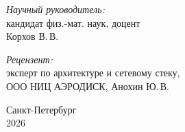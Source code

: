\documentclass[aspectratio=169,11pt]{beamer}
\begin{document}
\begin{frame}[plain]
        \begin{minipage}{\textwidth}
                \begin{minipage}[t]{0.45\linewidth}
                        \raggedright
                        {\scriptsize
                                \textit{Научный руководитель:}\\[0.15em]
                                кандидат физ.-мат. наук, доцент\\
                        Корхов В.\,В.}
                \end{minipage}
                \hfill
                \begin{minipage}[t]{0.45\linewidth}
                        \raggedright
                        {\scriptsize
                                \textit{Рецензент:}\\[0.15em]
                                эксперт по архитектуре и сетевому стеку,\\
                        ООО НИЦ АЭРОДИСК, Анохин Ю.\,В.}
                \end{minipage}
        \end{minipage}

        \vspace{0.2em}
        \noindent\rlap{\hspace*{-1cm}\textcolor{MainRed}{\rule{\paperwidth}{1pt}}}\par
        \vspace{0.4em}

        \begin{center}
                {\scriptsize
                        Санкт-Петербург\\[-0.5em]
                2026}
        \end{center}
\end{frame}
\end{document}
